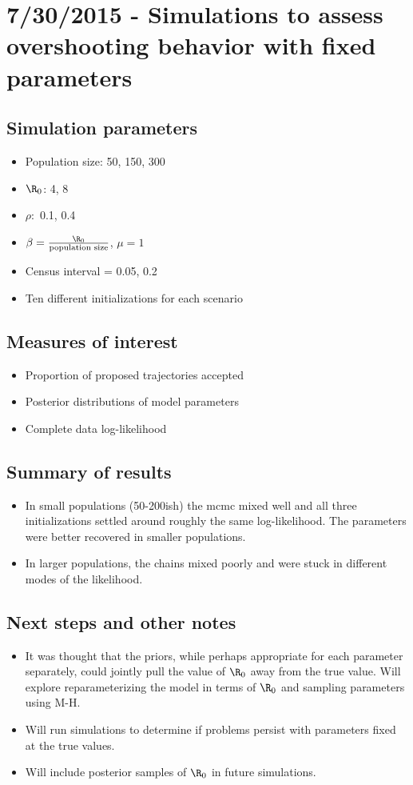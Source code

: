 \section*{7/30/2015 - Simulations to assess overshooting behavior with fixed parameters}
\subsection*{Simulation parameters}
\begin{itemize}
	\item Population size: 50, 150, 300
	\item $ \R_0 $: 4, 8
	\item $ \rho: $ 0.1, 0.4
	\item $ \beta =\frac{\R_0}{\text{population size}} $, $ \mu = 1 $
	\item Census interval = 0.05, 0.2
	\item Ten different initializations for each scenario
\end{itemize}
\subsection*{Measures of interest}
\begin{itemize}
	\item Proportion of proposed trajectories accepted
	\item Posterior distributions of model parameters
	\item Complete data log-likelihood
\end{itemize}
\subsection*{Summary of results}
\begin{itemize}
	\item In small populations (50-200ish) the mcmc mixed well and all three initializations settled around roughly the same log-likelihood. The parameters were better recovered in smaller populations.
	\item In larger populations, the chains mixed poorly and were stuck in different modes of the likelihood. 
\end{itemize}

\subsection*{Next steps and other notes}
\begin{itemize}
	\item It was thought that the priors, while perhaps appropriate for each parameter separately, could jointly pull the value of $ \R_0 $ away from the true value. Will explore reparameterizing the model in terms of $ \R_0 $  and sampling parameters using M-H. 
	\item Will run simulations to determine if problems persist with parameters fixed at the true values. 
	\item Will include posterior samples of $ \R_0 $ in future simulations.  
\end{itemize}
